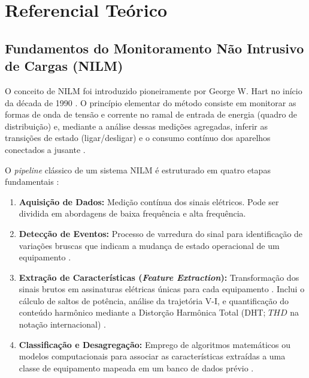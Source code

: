 \documentclass[12pt]{article}
\begin{document}
\section{Referencial Te\'orico}

\subsection{Fundamentos do Monitoramento N\~ao Intrusivo de Cargas (NILM)}

O conceito de NILM foi introduzido pioneiramente por George W. Hart no in\'icio da
d\'ecada de 1990 \citep{ref1}. O princ\'ipio elementar do m\'etodo consiste em
monitorar as formas de onda de tens\~ao e corrente no ramal de entrada de energia
(quadro de distribui\c{c}\~ao) e, mediante a an\'alise dessas medi\c{c}\~oes
agregadas, inferir as transi\c{c}\~oes de estado (ligar/desligar) e o consumo
cont\'inuo dos aparelhos conectados a jusante \citep{ref1}.

O \textit{pipeline} cl\'assico de um sistema NILM \'e estruturado em quatro etapas
fundamentais \citep{ref2,ref7}:

\begin{enumerate}
  \item \textbf{Aquisi\c{c}\~ao de Dados:} Medi\c{c}\~ao cont\'inua dos sinais
  el\'etricos. Pode ser dividida em abordagens de baixa frequ\^encia \citep{ref3}
  e alta frequ\^encia.

  \item \textbf{Detec\c{c}\~ao de Eventos:} Processo de varredura do sinal para
  identifica\c{c}\~ao de varia\c{c}\~oes bruscas que indicam a mudan\c{c}a de
  estado operacional de um equipamento \citep{ref2}.

  \item \textbf{Extra\c{c}\~ao de Caracter\'isticas (\textit{Feature
  Extraction}):} Transforma\c{c}\~ao dos sinais brutos em assinaturas el\'etricas
  \'unicas para cada equipamento \citep{ref2}. Inclui o c\'alculo de saltos de
  pot\^encia, an\'alise da trajet\'oria V-I, e quantifica\c{c}\~ao do conte\'udo
  harm\^onico mediante a Distor\c{c}\~ao Harm\^onica Total (DHT;
  $THD$ na nota\c{c}\~ao internacional) \citep{ref8}.

  \item \textbf{Classifica\c{c}\~ao e Desagrega\c{c}\~ao:} Emprego de algoritmos
  matem\'aticos ou modelos computacionais para associar as caracter\'isticas
  extra\'idas a uma classe de equipamento mapeada em um banco de dados pr\'evio
  \citep{ref4,ref6}.
\end{enumerate}
\end{document}
